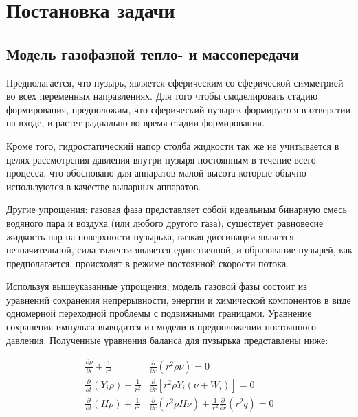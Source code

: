\section{Постановка задачи}

\subsection{Модель газофазной тепло- и массопередачи }

Предполагается, что пузырь, является сферическим со сферической симметрией во всех переменных направлениях. 
Для того чтобы смоделировать стадию формирования, предположим, что сферический пузырек формируется в отверстии на входе, и растет радиально во время стадии формирования.

Кроме того, гидростатический напор столба жидкости так же не учитывается в целях рассмотрения давления внутри пузыря постоянным в течение всего процесса, что обосновано для аппаратов малой высота которые обычно используются в качестве выпарных аппаратов.

Другие упрощения: газовая фаза представляет собой идеальным бинарную смесь водяного пара и воздуха (или любого другого газа), существует равновесие жидкость-пар на поверхности пузырька, вязкая диссипации является незначительной, сила тяжести является единственной, и образование пузырей, как предполагается, происходят в режиме постоянной скорости потока.

Используя вышеуказанные упрощения, модель газовой фазы состоит из уравнений сохранения непрерывности, энергии и химической компонентов в виде одномерной переходной проблемы с подвижными границами. 
Уравнение сохранения импульса выводится из модели в предположении постоянного давления.
% 
Полученные уравнения баланса для пузырька представлены ниже:


\begin{align}
\frac{\partial \rho}{\partial t} + \frac{1}{r^{2}}&\frac{\partial }{\partial r} (r^{2} \rho \nu)= 0 \\
\frac{\partial}{\partial t}(Y_{i}  \rho)+ \frac{1}{r^{2}}& \frac{\partial}{\partial r} \left[r^{2}  \rho   Y_{i}  \left(\nu  + W_{i} \right)\right] = 0 \\
\frac{\partial}{\partial t}(H \rho)+ \frac{1}{r^{2}}& \frac{\partial}{\partial r} \left(r^{2} \rho H \nu \right)+ \frac{1}{{r}^{2}}\frac{\partial }{\partial r}\left({r}^{2}q\right)=0 
\end{align}

